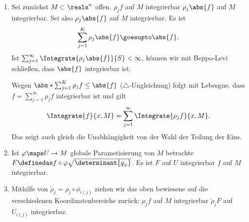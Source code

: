 \begin{ergaenzung*}
  \begin{enumerate}[label=\rechtsklammer{\arabic*}]
    \item Sei zunächst \( M\subset \reals^n \) offen. \( \rho_j f \) auf \( M \) integrierbar \tiff \( \rho_j \abs{f} \) auf \( M \) integrierbar.
    Sei also \( \rho_j\abs{f} \) auf \( M \) integrierbar. Es ist
    \begin{equation*}
      \sum_{j=1}^{K}\rho_j \abs{f}\goesupto \abs{f}.
    \end{equation*}
    Ist \( \sum_{j=1}^{\infty}\Integrate{\rho_j \abs{f}}{S}<\infty \), können wir mit Beppo-Levi schließen, dass \( \abs{f} \) integrierbar ist.

    Wegen \( \abs*{\sum_{j=1}^{K}\rho_j f}\leq \abs{f} \) (\( \triangle \)-Ungleichung) folgt mit Lebesgue, dass \( f=\sum_{j=1}^{\infty}\rho_j f \) integrierbar ist und gilt
    \begin{equation*}
      \Integrate{f}{x,M}=\sum_{j=1}^{\infty}\Integrate{\rho_j f}{x,M}.
    \end{equation*}
    Das zeigt auch gleich die Unabhängigkeit von der Wahl der Teilung der Eins.
    \item Ist \( \varphi\maps U\to M \) globale Parametisierung von \( M\) betrachte \( F\definedas f\circ \varphi \sqrt{\determinant{g_{\varphi}}} \). Es ist \( F \) auf \( U \) integrierbar \tiff \( f \) auf \( M \) integrierbar.
    \item Mithilfe von \( \tilde{\rho}_j=\rho_j \circ \phi_{i(j)} \) ziehen wir das oben bewiesene auf die verschiedenen Koordinatenbereiche zurück: \( \rho_j f \) auf \( M \) integrierbar \tiff \( \tilde{\rho}_j F \) auf \( U_{i(j)} \) integrierbar.
  \end{enumerate}
\end{ergaenzung*}
